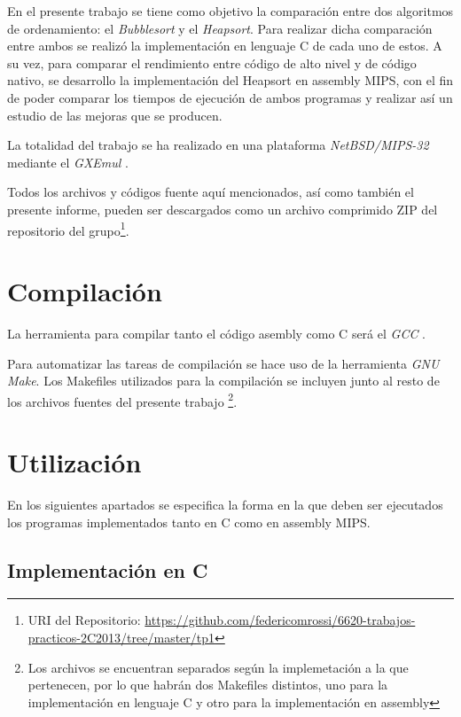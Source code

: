 \documentclass{article}
\begin{document}
	En el presente trabajo se tiene como objetivo la comparación entre dos algoritmos de ordenamiento: el \textit{Bubblesort} y el \textit{Heapsort}.
	Para realizar dicha comparación entre ambos se realizó la implementación en lenguaje C de cada uno de estos. A su vez, para comparar el rendimiento entre código de alto nivel y de código nativo, se desarrollo la implementación del Heapsort en assembly MIPS, con el fin de poder comparar los tiempos de ejecución de ambos programas y realizar así un estudio de las mejoras que se producen.
	\par
	La totalidad del trabajo se ha realizado en una plataforma \textit{NetBSD/MIPS-32} mediante el \textit{GXEmul} \cite{GXEMUL}.
	\par
	Todos los archivos y códigos fuente aquí mencionados, así como también el presente informe, pueden ser descargados como un archivo comprimido ZIP del repositorio del grupo\footnote{URI del Repositorio: \url{https://github.com/federicomrossi/6620-trabajos-practicos-2C2013/tree/master/tp1}}.
\bigskip




\section{Compilación}
	
	
	La herramienta para compilar tanto el código asembly como C será el \textit{GCC} \cite{GCC}. 
	\par
	Para automatizar las tareas de compilación se hace uso de la herramienta \textit{GNU Make}. Los Makefiles utilizados para la compilación se incluyen junto al resto de los archivos fuentes del presente trabajo \footnote{Los archivos se encuentran separados según la implemetación a la que pertenecen, por lo que habrán dos Makefiles distintos, uno para la implementación en lenguaje C y otro para la implementación en assembly}.
\bigskip




\section{Utilización}
	
	En los siguientes apartados se especifica la forma en la que deben ser ejecutados los programas implementados tanto en C como en assembly MIPS.



\subsection{Implementación en C}
\end{document}
